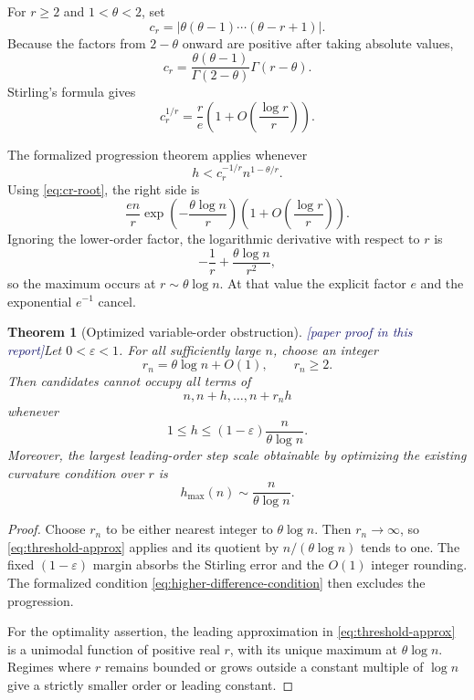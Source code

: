 \documentclass[11pt,oneside]{article}
\newtheorem{theorem}{Theorem}[section]
\theoremstyle{definition}
\newcommand{\tagPaper}{\textcolor{MidnightBlue}{\textsf{[paper proof in this report]}}}
\begin{document}
For \(r\ge2\) and \(1<\theta<2\), set
\[
  c_r=\left|\theta(\theta-1)\cdots(\theta-r+1)\right|.
\]
Because the factors from \(2-\theta\) onward are positive after taking absolute values,
\begin{equation}\label{eq:cr-gamma}
  c_r
  =\frac{\theta(\theta-1)}{\Gamma(2-\theta)}\Gamma(r-\theta).
\end{equation}
Stirling's formula gives
\begin{equation}\label{eq:cr-root}
  c_r^{1/r}
  =\frac re\left(1+O\!\left(\frac{\log r}{r}\right)\right).
\end{equation}

The formalized progression theorem applies whenever
\[
  h<c_r^{-1/r}n^{1-\theta/r}.
\]
Using \eqref{eq:cr-root}, the right side is
\begin{equation}\label{eq:threshold-approx}
  \frac{en}{r}
  \exp\!\left(-\frac{\theta\log n}{r}\right)
  \left(1+O\!\left(\frac{\log r}{r}\right)\right).
\end{equation}
Ignoring the lower-order factor, the logarithmic derivative with respect to \(r\) is
\[
  -\frac1r+\frac{\theta\log n}{r^2},
\]
so the maximum occurs at \(r\sim\theta\log n\).  At that value the explicit factor \(e\)
and the exponential \(e^{-1}\) cancel.

\begin{theorem}[Optimized variable-order obstruction]\label{thm:optimized-difference}
\tagPaper Let \(0<\varepsilon<1\).  For all sufficiently large \(n\), choose an integer
\[
  r_n=\theta\log n+O(1),\qquad r_n\ge2.
\]
Then candidates cannot occupy all terms of
\[
  n,n+h,\ldots,n+r_nh
\]
whenever
\[
  1\le h\le(1-\varepsilon)\frac{n}{\theta\log n}.
\]
Moreover, the largest leading-order step scale obtainable by optimizing the existing
curvature condition over \(r\) is
\[
  \boxed{\quad h_{\max}(n)\sim\frac{n}{\theta\log n}.\quad}
\]
\end{theorem}

\begin{proof}
Choose \(r_n\) to be either nearest integer to \(\theta\log n\).  Then \(r_n\to\infty\),
so \eqref{eq:threshold-approx} applies and its quotient by
\(n/(\theta\log n)\) tends to one.  The fixed \((1-\varepsilon)\) margin absorbs the
Stirling error and the \(O(1)\) integer rounding.  The formalized condition
\eqref{eq:higher-difference-condition} then excludes the progression.

For the optimality assertion, the leading approximation in
\eqref{eq:threshold-approx} is a unimodal function of positive real \(r\), with its unique
maximum at \(\theta\log n\).  Regimes where \(r\) remains bounded or grows outside a
constant multiple of \(\log n\) give a strictly smaller order or leading constant.
\end{proof}
\end{document}
